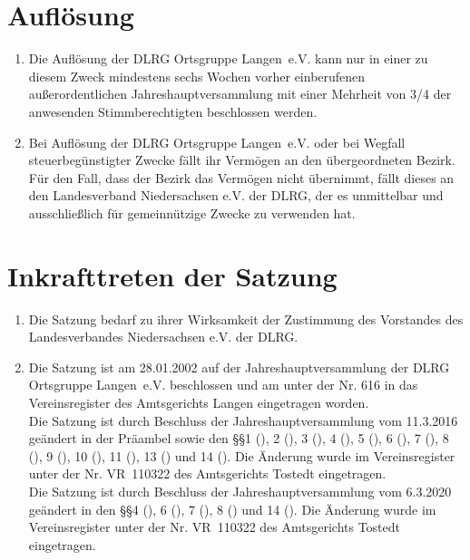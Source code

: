 \documentclass[%
12pt, %
a4paper, %
headsepline, %
parskip, %
headings=normal, %
]{scrreprt}
\begin{document}
\section{Auflösung}
\label{sec:aufloesung}
\begin{enumerate}
    \item Die Auflösung der DLRG Ortsgruppe Langen~e.V. kann nur in einer zu diesem Zweck mindestens sechs Wochen vorher einberufenen außerordentlichen Jahreshauptversammlung mit einer Mehrheit von \num{3/4} der anwesenden Stimmberechtigten beschlossen werden.
    \item Bei Auflösung der DLRG Ortsgruppe Langen~e.V. oder bei Wegfall steuerbegünstigter Zwecke fällt ihr Vermögen an den übergeordneten Bezirk. Für den Fall, dass der Bezirk das Vermögen nicht übernimmt, fällt dieses an den Landesverband Niedersachsen e.V. der DLRG, der es unmittelbar und ausschließlich für gemeinnützige Zwecke zu verwenden hat.
\end{enumerate}

\section{Inkrafttreten der Satzung}
\label{sec:inkrafttreten}
\begin{enumerate}
    \item Die Satzung bedarf zu ihrer Wirksamkeit der Zustimmung des Vorstandes des Landesverbandes Niedersachsen e.V. der DLRG.
    \item Die Satzung ist am 28.01.2002 auf der Jahreshauptversammlung der DLRG Ortsgruppe Langen~e.V. beschlossen und am \hspace{1.5cm} unter der Nr. 616 in das Vereinsregister des Amtsgerichts Langen eingetragen worden.\\
      Die Satzung ist durch Beschluss der Jahreshauptversammlung vom 11.3.2016 geändert in der Präambel sowie den \S\S 1 (), 2 (), 3 (), 4 (), 5 (), 6 (), 7 (), 8 (), 9 (), 10 (), 11 (), 13 () und 14 (). Die Änderung wurde im Vereinsregister unter der Nr. VR~110322 des Amtsgerichts Tostedt eingetragen.\\
      Die Satzung ist durch Beschluss der Jahreshauptversammlung vom 6.3.2020 geändert in den \S\S 4 (), 6 (), 7 (), 8 () und 14 (). Die Änderung wurde im Vereinsregister unter der Nr. VR~110322 des Amtsgerichts Tostedt eingetragen.
\end{enumerate}
\end{document}

